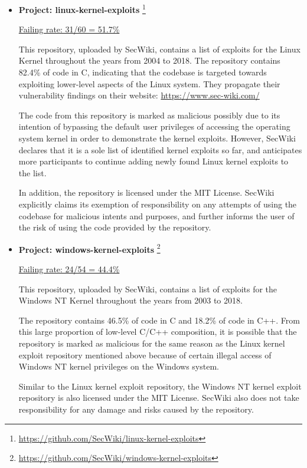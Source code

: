 \documentclass[]{acmart}
\begin{document}
\begin{itemize}
    \item { \bf Project: linux-kernel-exploits }\footnote{\url{https://github.com/SecWiki/linux-kernel-exploits}}

    \underline{ Failing rate: 31/60 = 51.7\% }

    This repository, uploaded by SecWiki, contains a list of exploits for the Linux Kernel throughout the years from 2004 to 2018. The repository contains 82.4\% of code in C, indicating that the codebase is targeted towards exploiting lower-level aspects of the Linux system. They propagate their vulnerability findings on their website: \url{https://www.sec-wiki.com/}

    The code from this repository is marked as malicious possibly due to its intention of bypassing the default user privileges of accessing the operating system kernel in order to demonstrate the kernel exploits. However, SecWiki declares that it is a sole list of identified kernel exploits so far, and anticipates more participants to continue adding newly found Linux kernel exploits to the list. 

    In addition, the repository is licensed under the MIT License. SecWiki explicitly claims its exemption of responsibility on any attempts of using the codebase for malicious intents and purposes, and further informs the user of the risk of using the code provided by the repository.
    \item { \bf Project: windows-kernel-exploits }\footnote{\url{https://github.com/SecWiki/windows-kernel-exploits}}

    \underline{ Failing rate: 24/54 = 44.4\% }
    
    This repository, uploaded by SecWiki, contains a list of exploits for the Windows NT Kernel throughout the years from 2003 to 2018. 
    
    The repository contains 46.5\% of code in C and 18.2\% of code in C++. From this large proportion of low-level C/C++ composition, it is possible that the repository is marked as malicious for the same reason as the Linux kernel exploit repository mentioned above because of certain illegal access of Windows NT kernel privileges on the Windows system. 
    
    Similar to the Linux kernel exploit repository, the Windows NT kernel exploit repository is also licensed under the MIT License. SecWiki also does not take responsibility for any damage and risks caused by the repository. 
\end{itemize}
\end{document}
